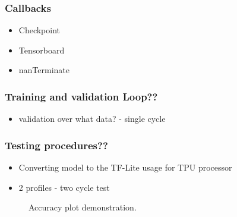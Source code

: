 
\subsubsection{Callbacks}
\begin{itemize}
    \item Checkpoint \\
    \item Tensorboard \\
    \item nanTerminate \\    
\end{itemize}
\subsubsection{Training and validation Loop??}
\begin{itemize}
    \item validation over what data? - single cycle \\
\end{itemize}
\subsubsection{Testing procedures??}
\begin{itemize}
    \item Converting model to the TF-Lite usage for TPU processor \\
    \item 2 profiles - two cycle test \\
\end{itemize}
\begin{figure}[ht]
    \centering
    
    \caption{Accuracy plot demonstration.}
    \label{fig:plot_demo}
\end{figure}
